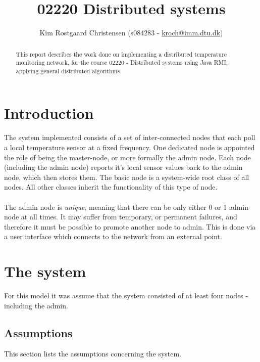 \documentclass[10pt,a4paper]{article}
\begin{document}
\def\File#1{\textsf{#1}}
\def\Code#1{\texttt{#1}}
\def\Key#1{\textsf{#1}}

\title{02220 Distributed systems}
\author{Kim Rostgaard Christensen (s084283 - \href{mailto:kroch@imm.dtu.dk}{kroch@imm.dtu.dk})}

\maketitle

\tableofcontents

\begin{abstract}
This report describes the work done on implementing a distributed temperature monitoring network, for the course 02220 - Distributed systems using Java RMI, applying general distributed algorithms.
\end{abstract}

\section{Introduction}
The system implemented consists of a set of inter-connected nodes that each poll a local temperature sensor at a fixed frequency. One dedicated node is appointed the role of being the master-node, or more formally the admin node. Each node (including the admin node) reports it's local sensor values back to the admin node, which then stores them.
The basic node is a system-wide root class of all nodes. All other classes inherit the functionality of this type of node.\\\\
The admin node is \emph{unique}, meaning that there can be only either 0 or 1 admin node at all times. It may suffer from temporary, or permanent failures, and therefore it must be possible to promote another node to admin. This is done via a user interface which connects to the network from an external point.

\section{The system}

For this model it was assume that the system consisted of at least four nodes - including the admin.

\subsection{Assumptions}
This section lists the assumptions concerning the system.
\end{document}
